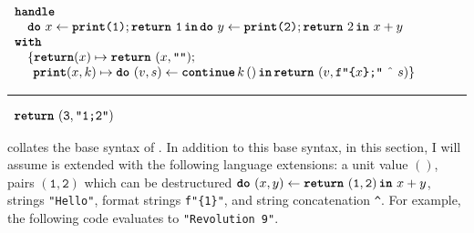 \begin{code}
  \begin{efflst}
    $\begin{array}{l}
      \textbf{\texttt{handle}} \\
      \quad \texttt{\textbf{do}} \,\, {x} \leftarrow {\texttt{\textbf{print}(1)};\texttt{\textbf{return}} \,\, {\texttt{1}}} \, \textbf{\texttt{in}} \, {{\texttt{\textbf{do}} \,\, {y} \leftarrow {\texttt{\textbf{print}(2)};\texttt{\textbf{return}} \,\, {2}} \, \textbf{\texttt{in}} \, {\, x + y}}} \\
      \textbf{\texttt{with}} \\
      \quad \{ \textbf{\texttt{return}}(x) \mapsto {\texttt{\textbf{return}} \,\, {(x, \texttt{""})}}; \\
      \quad \; \, \textbf{\texttt{print}}(x, k) \mapsto {\texttt{\textbf{do}} \,\, {(v, s)} \leftarrow {\textbf{\texttt{continue}} \, {k} \, {()}} \, \textbf{\texttt{in}} \, {\texttt{\textbf{return}} \,\, {(v, \texttt{f"\{$x$\};"} \text{ \^\ } s)}}}\}\\
    \end{array}$

    \vspace{2mm} 
\textcolor{effComment}{\hrule height 0.2mm \relax}
\vspace{2mm} 

\textcolor{effComment}{$\begin{array}{l}\texttt{\textbf{return}} \,\, {(\texttt{3}, \texttt{"1;2"})}\end{array}$}

  \end{efflst}
  \label{listing:efflang-running-example}
  \end{code}

 collates the base syntax of \efflang. In addition to this base syntax, in this section, I will assume \efflang{} is extended with the following language extensions: a unit value $()$, pairs $(\texttt{1}, \texttt{2})$ which can be destructured $\texttt{\textbf{do}} \,\, {(x, y)} \leftarrow {\texttt{\textbf{return}} \,\, {(\texttt{1}, \texttt{2})}} \, \textbf{\texttt{in}} \, {\, x+y}$, strings \texttt{"Hello"}, format strings \texttt{f"\{1\}"}, and string concatenation \texttt{\^}. For example, the following code evaluates to \texttt{"Revolution 9"}.

